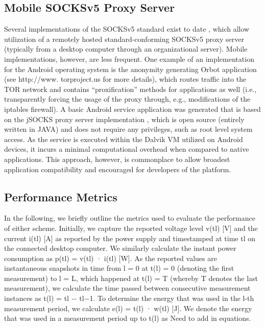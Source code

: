 \subsection*{Mobile SOCKSv5 Proxy Server}
Several implementations of the SOCKSv5 standard 
exist to date \cite{rfc1928}, which allow utilization of a remotely hosted
standard-conforming SOCKSv5 proxy server (typically from
a desktop computer through an organizational server). Mobile
implementations, however, are less frequent. One example
of an implementation for the Android operating system is
the anonymity generating Orbot application (see http://www.
torproject.us for more details), which routes traffic into the
TOR network and contains “proxification” methods for applications
as well (i.e., transparently forcing the usage of the
proxy through, e.g., modifications of the iptables firewall). A basic Android service application was generated that is based on
the jSOCKS proxy server implementation \cite{kouzoubov2011}, which is open source
(entirely written in JAVA) and does not require any
privileges, such as root level system access. As the service is
executed within the Dalvik VM utilized on Android devices,
it incurs a minimal computational overhead when compared to
native applications. This approach, however, is commonplace
to allow broadest application compatibility and encouraged for
developers of the platform.

\subsection*{Performance Metrics}
In the following, we briefly outline the metrics used to evaluate
the performance of either scheme. Initially, we capture
the reported voltage level v(tl) [V] and the current i(tl) [A]
as reported by the power supply and timestamped at time tl
on the connected desktop computer. We similarly calculate
the instant power consumption as p(tl) = v(tl) · i(tl) [W].
As the reported values are instantaneous snapshots in time
from l = 0 at t(l) = 0 (denoting the first measurement) to
l = L, which happened at t(l) = T (whereby T denotes
the last measurement), we calculate the time passed between
consecutive measurement instances as t(l) = tl − tl−1. To
determine the energy that was used in the l-th measurement
period, we calculate e(l) = t(l) · w(tl) [J]. We denote the
energy that was used in a measurement period up to t(l) as
\newline
\newline
Need to add in equations.
\newline


